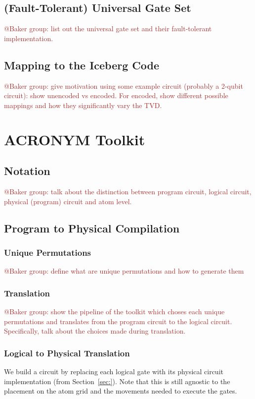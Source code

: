 \subsection{(Fault-Tolerant) Universal Gate Set}
\textcolor{brown}{@Baker group: list out the universal gate set and their fault-tolerant implementation.}

\subsection{Mapping to the Iceberg Code}
\textcolor{brown}{@Baker group: give motivation using some example circuit (probably a 2-qubit circuit): show unencoded vs encoded. For encoded, show different possible mappings and how they significantly vary the TVD.}


\section{ACRONYM Toolkit}
\subsection{Notation}
\textcolor{brown}{@Baker group: talk about the distinction between program circuit, logical circuit, physical (program) circuit and atom level.}

\subsection{Program to Physical Compilation}
\subsubsection{Unique Permutations}
\textcolor{brown}{@Baker group: define what are unique permutations and how to generate them}

\subsubsection{Translation}
\textcolor{brown}{@Baker group: show the pipeline of the toolkit which choses each unique permutations and translates from the program circuit to the logical circuit. Specifically, talk about the choices made during translation.}

\subsubsection{Logical to Physical Translation}
We build a circuit by replacing each logical gate with its physical circuit implementation (from Section~\ref{sec:}). Note that this is still agnostic to the placement on the atom grid and the movements needed to execute the gates.

